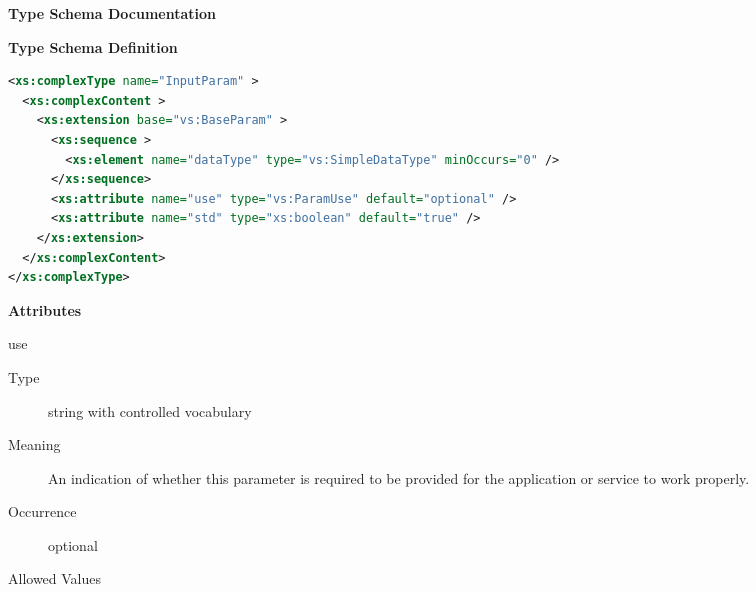 \documentclass[11pt,a4paper]{ivoa}
\begin{document}
\begin{generated}
\begingroup
      	\renewcommand*\descriptionlabel[1]{%
      	\hbox to 5.5em{\emph{#1}\hfil}}\vspace{2ex}\noindent\textbf{ Type Schema Documentation}



\vspace{1ex}\noindent\textbf{ Type Schema Definition}

\begin{lstlisting}[language=XML,basicstyle=\footnotesize]
<xs:complexType name="InputParam" >
  <xs:complexContent >
    <xs:extension base="vs:BaseParam" >
      <xs:sequence >
        <xs:element name="dataType" type="vs:SimpleDataType" minOccurs="0" />
      </xs:sequence>
      <xs:attribute name="use" type="vs:ParamUse" default="optional" />
      <xs:attribute name="std" type="xs:boolean" default="true" />
    </xs:extension>
  </xs:complexContent>
</xs:complexType>
\end{lstlisting}

\vspace{0.5ex}\noindent\textbf{ Attributes}

\begingroup\small\begin{bigdescription}
\item[use]
\begin{description}
\item[Type] string with controlled vocabulary
\item[Meaning] 
                     An indication of whether this parameter is
                     required to be provided for the application
                     or service to work properly.  
                  
\item[Occurrence] optional

\item[Allowed Values]\hfil
{}
\end{description}
\end{bigdescription}
\end{generated}
\end{document}
